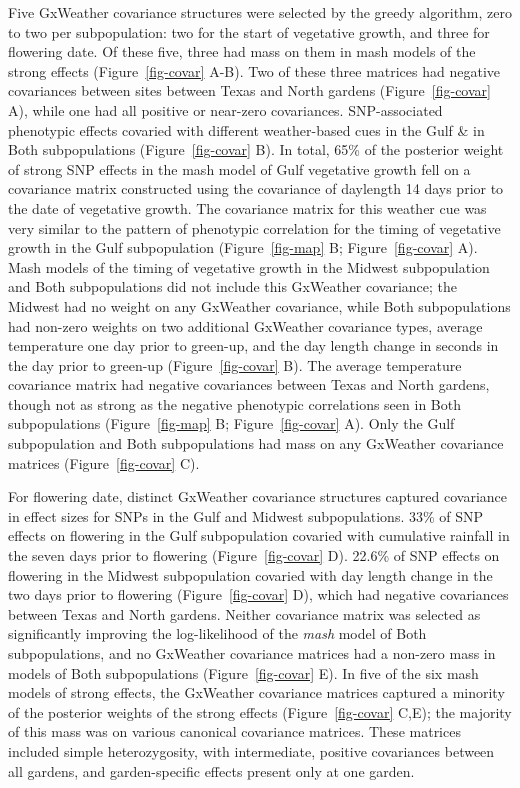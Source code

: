 \documentclass[
  9pt,
  twocolumn,
  twoside]{pnas-new}
\begin{document}
Five GxWeather covariance structures were selected by the greedy
algorithm, zero to two per subpopulation: two for the start of
vegetative growth, and three for flowering date. Of these five, three
had mass on them in mash models of the strong effects
(Figure~\ref{fig-covar} A-B). Two of these three matrices had negative
covariances between sites between Texas and North gardens
(Figure~\ref{fig-covar} A), while one had all positive or near-zero
covariances. SNP-associated phenotypic effects covaried with different
weather-based cues in the Gulf \& in Both subpopulations
(Figure~\ref{fig-covar} B). In total, 65\% of the posterior weight of
strong SNP effects in the mash model of Gulf vegetative growth fell on a
covariance matrix constructed using the covariance of daylength 14 days
prior to the date of vegetative growth. The covariance matrix for this
weather cue was very similar to the pattern of phenotypic correlation
for the timing of vegetative growth in the Gulf subpopulation
(Figure~\ref{fig-map} B; Figure~\ref{fig-covar} A). Mash models of the
timing of vegetative growth in the Midwest subpopulation and Both
subpopulations did not include this GxWeather covariance; the Midwest
had no weight on any GxWeather covariance, while Both subpopulations had
non-zero weights on two additional GxWeather covariance types, average
temperature one day prior to green-up, and the day length change in
seconds in the day prior to green-up (Figure~\ref{fig-covar} B). The
average temperature covariance matrix had negative covariances between
Texas and North gardens, though not as strong as the negative phenotypic
correlations seen in Both subpopulations (Figure~\ref{fig-map} B;
Figure~\ref{fig-covar} A). Only the Gulf subpopulation and Both
subpopulations had mass on any GxWeather covariance matrices
(Figure~\ref{fig-covar} C).

For flowering date, distinct GxWeather covariance structures captured
covariance in effect sizes for SNPs in the Gulf and Midwest
subpopulations. 33\% of SNP effects on flowering in the Gulf
subpopulation covaried with cumulative rainfall in the seven days prior
to flowering (Figure~\ref{fig-covar} D). 22.6\% of SNP effects on
flowering in the Midwest subpopulation covaried with day length change
in the two days prior to flowering (Figure~\ref{fig-covar} D), which had
negative covariances between Texas and North gardens. Neither covariance
matrix was selected as significantly improving the log-likelihood of the
\emph{mash} model of Both subpopulations, and no GxWeather covariance
matrices had a non-zero mass in models of Both subpopulations
(Figure~\ref{fig-covar} E). In five of the six mash models of strong
effects, the GxWeather covariance matrices captured a minority of the
posterior weights of the strong effects (Figure~\ref{fig-covar} C,E);
the majority of this mass was on various canonical covariance matrices.
These matrices included simple heterozygosity, with intermediate,
positive covariances between all gardens, and garden-specific effects
present only at one garden.
\end{document}
